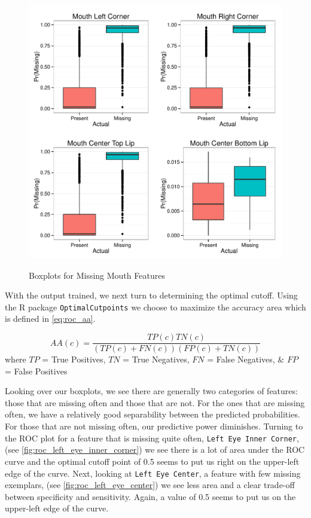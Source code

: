 \documentclass[journal]{IEEEtran}
\begin{document}
\begin{figure}[!ht]
  \centering
  \caption{Boxplots for Missing Mouth Features}
  \includegraphics[scale=.49]{logistic_boxplots_mouth.pdf}
  \label{fig:logistic_boxplots_mouth}
\end{figure}


With the output trained, we next turn to determining the optimal cutoff.  Using the R package \texttt{OptimalCutpoints} we choose to maximize the accuracy area \cite{lewis2008use,greiner1995two,greiner1996two} which is defined in \cref{eq:roc_aa}.

\[\label{eq:roc_aa}
AA(c)=\frac{TP(c)TN(c)}{(TP(c)+FN(c))(FP(c)+TN(c))}
\]
where $TP$ = True Positives, $TN$ = True Negatives, $FN$ = False Negatives, \& $FP$ = False Positives

Looking over our boxplots, we see there are generally two categories of features: those that are missing often and those that are not.  For the ones that are missing often, we have a relatively good separability between the predicted probabilities.  For those that are not missing often, our predictive power diminishes.  Turning to the ROC plot for a feature that is missing quite often, \texttt{Left Eye Inner Corner}, (see \cref{fig:roc_left_eye_inner_corner}) we see there is a lot of area under the ROC curve and the optimal cutoff point of 0.5 seems to put us right on the upper-left edge of the curve.  Next, looking at \texttt{Left Eye Center}, a feature with few missing exemplars, (see \cref{fig:roc_left_eye_center}) we see less area and a clear trade-off between specificity and sensitivity.  Again, a value of 0.5 seems to put us on the upper-left edge of the curve.
\end{document}
